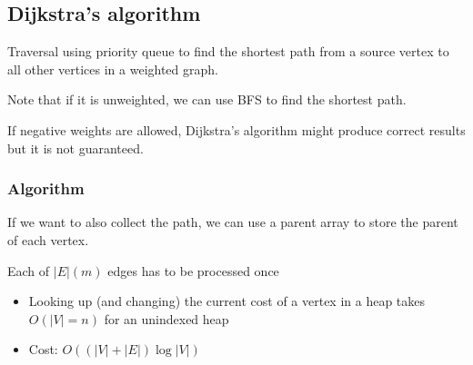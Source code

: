 \documentclass[letterpaper,12pt]{article}
\begin{document}
\subsection{Dijkstra's algorithm}
Traversal using priority queue to find the shortest path from a source vertex to all other vertices in a weighted graph.

Note that if it is unweighted, we can use BFS to find the shortest path.

If negative weights are allowed, Dijkstra's algorithm might produce correct results but it is not guaranteed. 

\subsubsection{Algorithm}
\begin{algorithmic}
            \EndIf
        \EndFor
    \EndWhile
\end{algorithmic}
If we want to also collect the path, we can use a parent array to store the parent of each vertex.

Each of $|E|(m)$ edges has to be processed once \begin{itemize}
    \item Looking up (and changing) the current cost of a vertex in a heap takes $O(|V| = n)$ for an unindexed heap
    \item Cost: $O((|V|+|E|)\log |V|)$
\end{itemize}
\end{document}
